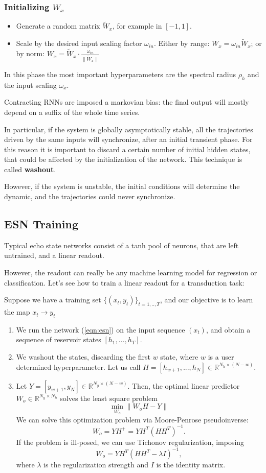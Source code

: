 \documentclass[oneside]{book}
\newcommand{\R}{\mathbb{R}}
\theoremstyle{definition}
\theoremstyle{plain}
\begin{document}
\subsubsection{Initializing $W_x$}
\begin{itemize}
    \item Generate a random matrix $\tilde{W}_x$, for example in $[-1, 1]$.
    \item Scale by the desired input scaling factor $\omega_{in}$. Either by range: $W_x = \omega_{in} \tilde{W}_x$; or by norm: $W_x=\tilde{W}_x\cdot \frac{\omega_{in}}{\|\tilde{W}_x\|}$
\end{itemize}

In this phase the most important hyperparameters are the spectral radius $\rho_h$ and the input scaling $\omega_x$.

Contracting RNNs are imposed a markovian bias: the final output will mostly depend on a suffix of the whole time series.

In particular, if the system is globally asymptotically stable, all the trajectories driven by the same inputs will synchronize, after an initial transient phase.
For this reason it is important to discard a certain number of initial hidden states, that could be affected by the initialization of the network. This technique is called \textbf{washout}.

However, if the system is unstable, the initial conditions will determine the dynamic, and the trajectories could never synchronize.

\subsection{ESN Training }
Typical  echo state networks consist of a tanh pool of neurons, that are left untrained, and a linear readout. 

However, the readout can really be any machine learning model for regression or classification. Let's see how to train a linear readout for a transduction task:

Suppose we have a training set $\{(x_t,y_t)\}_{t=1,..,T}$, and our objective is to learn the map $x_t\to y_t$

\begin{enumerate}
    \item We run the network (\ref{eqn:esn}) on  the input sequence $(x_t)$, and obtain a sequence of reservoir states $[h_1,...,h_T]$.
    \item We washout the states, discarding the first $w$ state, where $w$ is a user determined hyperparameter. Let us call $H=[h_{w+1},...,h_N]\in\R^{N_h\times (N-w)}$.
    \item Let $Y=[y_{w+1}, y_N]\in \R^{N_y\times(N-w)}$.  Then, the optimal linear predictor $W_o\in\R^{N_y\times N_h}$ solves the least square problem
    \[
        \min_{W_o} \|W_oH -Y\|
    \]
    We can solve this optimization problem via Moore-Penrose pseudoinverse: 
     \[W_o =YH^+=YH^T(HH^T)^{-1}.\] 
    If the problem is ill-posed, we can use Tichonov regularization, imposing
    \[
        W_o=YH^T(HH^T-\lambda I)^{-1},
    \]
    where $\lambda$ is the regularization strength and $I$ is the identity matrix.
\end{enumerate}
\end{document}
